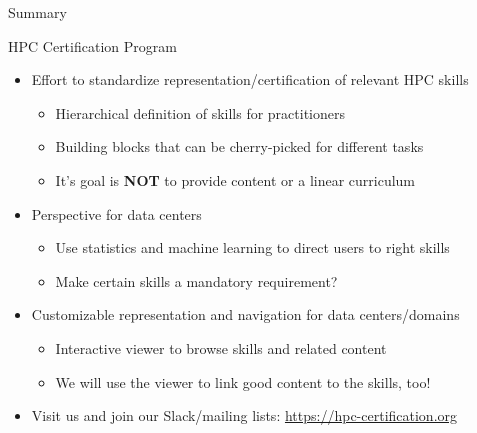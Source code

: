 \documentclass[compress,aspectratio=169]{beamer}
\begin{document}
\begin{frame}{Summary}

	\begin{block}{HPC Certification Program}
		\begin{itemize}
			\item Effort to standardize representation/certification of relevant HPC skills
      \begin{itemize}
        \item Hierarchical definition of skills for practitioners
        \item Building blocks that can be cherry-picked for different tasks
				\item It's goal is \textbf{NOT} to provide content or a linear curriculum
      \end{itemize}
			\item Perspective for data centers
				\begin{itemize}
					\item Use statistics and machine learning to direct users to right skills
					\item Make certain skills a mandatory requirement?
				\end{itemize}
			\item Customizable representation and navigation for data centers/domains
      \begin{itemize}
        \item Interactive viewer to browse skills and related content
				\item We will use the viewer to link good content to the skills, too!
      \end{itemize}
      \item Visit us and join our Slack/mailing lists: \url{https://hpc-certification.org}
		\end{itemize}
	\end{block}
  \label{pg:lastpage}
\end{frame}
\end{document}
